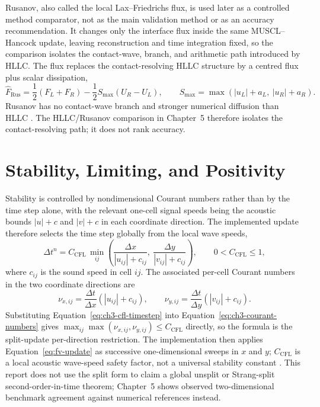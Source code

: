 Rusanov, also called the local Lax--Friedrichs flux, is used later as a
controlled method comparator, not as the main validation method or as an
accuracy recommendation. It changes only the
interface flux inside the same MUSCL--Hancock update, leaving reconstruction and
time integration fixed, so the comparison isolates the contact-wave, branch, and
arithmetic path introduced by HLLC. The flux replaces the contact-resolving HLLC
structure by a centred flux plus scalar dissipation,
\begin{equation}\label{eq:ch3-rusanov}
  \widehat F_{\mathrm{Rus}}
  =
  \frac12\left(F_L+F_R\right)
  -\frac12 S_{\max}\left(U_R-U_L\right),
  \qquad
  S_{\max}=\max\left(|u_L|+a_L,\ |u_R|+a_R\right).
\end{equation}
Rusanov has no contact-wave branch and stronger numerical diffusion than HLLC \citep{harten_lax_vanleer_1983,toro2009}. The HLLC/Rusanov comparison in Chapter~5 therefore isolates the contact-resolving path; it does not rank accuracy.

\section{Stability, Limiting, and Positivity}
\label{sec:ch3-stability}
Stability is controlled by nondimensional Courant numbers rather than by the
time step alone, with the relevant one-cell signal speeds being the acoustic
bounds \(|u|+c\) and \(|v|+c\) in each coordinate direction. The implemented
update therefore selects the time step globally from the local wave speeds,
\begin{equation}\label{eq:ch3-cfl-timestep}
  \Delta t^{n}
  =
  C_{\mathrm{CFL}}\,
  \min_{ij}\!\left(
    \frac{\Delta x}{|u_{ij}|+c_{ij}},\
    \frac{\Delta y}{|v_{ij}|+c_{ij}}
  \right),
  \qquad
  0<C_{\mathrm{CFL}}\le 1,
\end{equation}
where \(c_{ij}\) is the sound speed in cell \(ij\). The associated per-cell
Courant numbers in the two coordinate directions are
\begin{equation}\label{eq:ch3-courant-numbers}
  \nu_{x,ij}
  =
  \frac{\Delta t}{\Delta x}\left(|u_{ij}|+c_{ij}\right),
  \qquad
  \nu_{y,ij}
  =
  \frac{\Delta t}{\Delta y}\left(|v_{ij}|+c_{ij}\right).
\end{equation}
Substituting Equation~\ref{eq:ch3-cfl-timestep} into
Equation~\ref{eq:ch3-courant-numbers} gives
\(\max_{ij}\max(\nu_{x,ij},\nu_{y,ij})\le C_{\mathrm{CFL}}\) directly, so the
formula is the split-update per-direction restriction. The implementation then
applies Equation~\ref{eq:fv-update} as successive one-dimensional sweeps in
\(x\) and \(y\); \(C_{\mathrm{CFL}}\) is a local acoustic wave-speed safety
factor, not a universal stability constant \citep{toro2009,leveque_2002}. This
report does not use the split form to claim a global unsplit
or Strang-split second-order-in-time theorem; Chapter~5 shows observed
two-dimensional benchmark agreement against numerical references instead.

